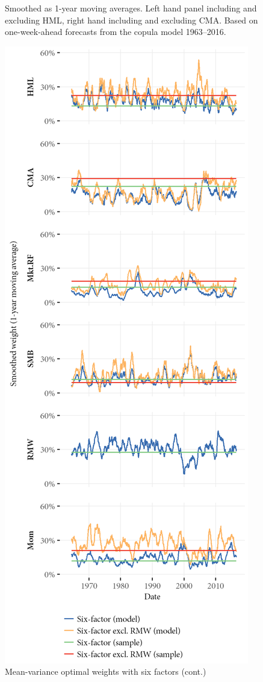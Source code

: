 \begin{figure}[htbp]
  \begin{longcaption}
    Smoothed as 1-year moving averages. Left hand panel including and excluding HML, right hand including and excluding CMA. Based on one-week-ahead forecasts from the copula model 1963--2016.
  \end{longcaption}
\end{figure}

\begin{figure}[htbp]
  \ContinuedFloat
  \centering
  \includegraphics[scale=1]{graphics/weights/main_Weights_MV_6F_6F_EXCL_RMW.png}
  \footnotesize
  \caption{Mean-variance optimal weights with six factors (cont.)}
\end{figure}



